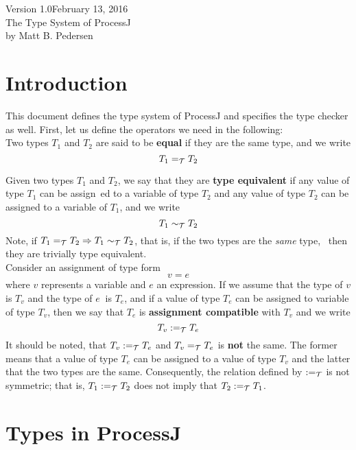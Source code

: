 \documentclass[pdflatex,11pt,letter]{article}
\newcommand{\te}{=_{\cal T}}
\newcommand{\teq}{\sim_{\cal T}}
\newcommand{\ac}{:=_{\cal T}}
\begin{document}
\begin{center}
Version 1.0\hfill{}February 13, 2016\\[0.5cm]
{\Huge The Type System of ProcessJ}\\[0.5cm]
by Matt B. Pedersen
\end{center}

\section{Introduction}

This document defines the type system of ProcessJ and specifies the type checker as well. First, let us define the operators we need in the following:\\

\noindent
Two types $T_1$ and $T_2$ are said to be {\bf equal} if they are the same type, and we write
\[
T_1 \te T_2
\]

\noindents
Given two types $T_1$ and $T_2$, we say that they are {\bf type equivalent} if any value of type $T_1$ can be assign\
ed to a variable of type $T_2$ and any value of type $T_2$ can be assigned to a variable of $T_1$, and we write
\[
T_1 \teq T_2
\]
Note, if $T_1 \te T_2 \Rightarrow T_1 \teq T_2$, that is, if the two types are the {\it same} type, \
then they are trivially type equivalent.\\

\noindent
Consider an assignment of type form
\[
v = e
\]
where $v$ represents a variable and $e$ an expression. If we assume that the type of $v$ is $T_v$ and the type of $e\
$ is $T_e$, and if a value of type $T_e$ can be assigned to variable of type $T_v$, then we say that $T_e$ is {\bf assignment compatible} with $T_v$ and we write
\[
T_v \ac T_e
\]
It should be noted, that $T_v \ac T_e$ and $T_v \te T_e$ is {\bf not} the same. The former means that a value of type $T_e$ can be assigned to a value of type $T_v$ and the latter that the two types are the same. Consequently, the relation defined by $\ac$ is not symmetric; that is, $T_1 \ac T_2$ does not imply that $T_2 \ac T_1$.


\section{Types in ProcessJ}
\end{document}
